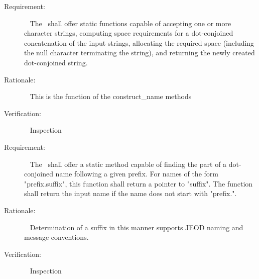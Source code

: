 \label{reqt:SC}
\begin{description}
  \item[Requirement:]\ \newline
The \NamedItemDesc\ shall offer static functions capable of accepting one or more 
character strings, computing space requirements for a dot-conjoined concatenation
of the input strings, allocating the required space (including the null character terminating the string), and returning the newly created dot-conjoined string.
  \item[Rationale:]\ \newline
This is the function of the construct\_name methods

  \item[Verification:]\ \newline
    Inspection
\end{description}
\label{reqt:SD}
\begin{description}
\item[Requirement:]\ \newline
The \NamedItemDesc\ shall offer a static method capable of finding the part of a dot-conjoined name 
             following a given prefix. For names of the form "prefix.suffix",
             this function shall return a pointer to "suffix". The function shall return 
             the input name if the name does not start with "prefix.".
\item[Rationale:]\ \newline
Determination of a suffix in this manner supports JEOD naming and message conventions.
  \item[Verification:]\ \newline
    Inspection
\end{description}